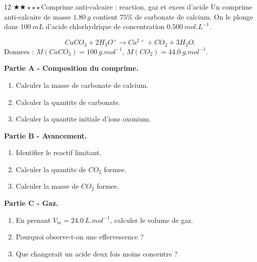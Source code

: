 \documentclass[11pt,a4paper]{article}
\newcommand{\difftwo}{\(\bigstar\bigstar\star\star\star\)}
\begin{document}
\begin{probleme}{12 \difftwo}{Comprime anti-calcaire : reaction, gaz et exces d'acide}
Un comprime anti-calcaire de masse \(\SI{1.80}{g}\) contient \(75\%\) de carbonate de calcium. On le plonge dans \(\SI{100}{mL}\) d'acide chlorhydrique de concentration \(\SI{0.500}{mol.L^{-1}}\).

\[
CaCO_3+2H_3O^+\rightarrow Ca^{2+}+CO_2+3H_2O.
\]
Donnees : \(M(CaCO_3)=\SI{100}{g.mol^{-1}}\), \(M(CO_2)=\SI{44.0}{g.mol^{-1}}\).

\textbf{Partie A - Composition du comprime.}
\begin{enumerate}
\item Calculer la masse de carbonate de calcium.
\item Calculer la quantite de carbonate.
\item Calculer la quantite initiale d'ions oxonium.
\end{enumerate}

\textbf{Partie B - Avancement.}
\begin{enumerate}[resume]
\item Identifier le reactif limitant.
\item Calculer la quantite de \(CO_2\) formee.
\item Calculer la masse de \(CO_2\) formee.
\end{enumerate}

\textbf{Partie C - Gaz.}
\begin{enumerate}[resume]
\item En prenant \(V_m=\SI{24.0}{L.mol^{-1}}\), calculer le volume de gaz.
\item Pourquoi observe-t-on une effervescence ?
\item Que changerait un acide deux fois moins concentre ?
\end{enumerate}
\end{probleme}
\end{document}
